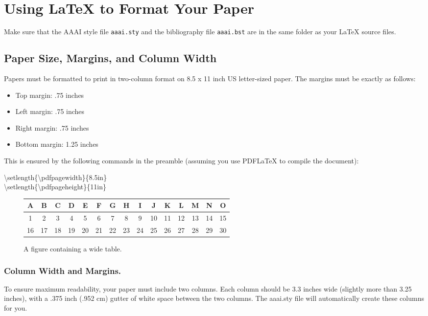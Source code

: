 \documentclass[letterpaper]{article}
\begin{document}
\section{Using \LaTeX{} to Format Your Paper}
Make sure that the AAAI style file \texttt{aaai.sty} and the bibliography file \texttt{aaai.bst} are in the same folder as your \LaTeX{} source files.


\subsection{Paper Size, Margins, and Column Width}
Papers must be formatted to print in two-column format on 8.5 x 11 inch US letter-sized paper. The margins must be exactly as follows: 
\begin{itemize}
\item Top margin: .75 inches
\item Left margin: .75 inches
\item Right margin: .75 inches
\item Bottom margin: 1.25 inches
\end{itemize} 
This is ensured by the following commands in the preamble (assuming you use PDF\LaTeX{} to compile the document):
\begin{center}
\textbackslash setlength\{\textbackslash pdfpagewidth\}\{8.5in\} \\
\textbackslash setlength\{\textbackslash pdfpageheight\}\{11in\}
\end{center}

\begin{figure*}
\begin{center}
\begin{tabular}{|c|c|c|c|c|c|c|c|c|c|c|c|c|c|c|} \hline
A & B &C & D & E & F & G & H & I & J& K &L &M&N&O  \\  \hline
1 & 2 & 3 & 4 & 5 & 6 & 7 & 8 & 9 & 10 & 11 & 12 & 13 & 14 & 15 \\
16 & 17 & 18 & 19 & 20 & 21 & 22 & 23 & 24 & 25 & 26 & 27 & 28 & 29 &30 \\ \hline
\end{tabular}
\end{center}
\caption{A figure containing a wide table.}\label{figu:2}
\end{figure*}


\subsubsection{Column Width and Margins.}
To ensure maximum readability, your paper must include two columns. Each column should be 3.3 inches wide (slightly more than 3.25 inches), with a .375 inch (.952 cm) gutter of white space between the two columns. The aaai.sty file will automatically create these columns for you. 
\end{document}
